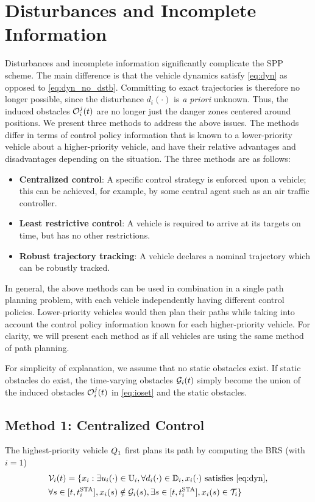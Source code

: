 \section{Disturbances and Incomplete Information \label{sec:obs_gen}}
Disturbances and incomplete information significantly complicate the SPP scheme. The main difference is that the vehicle dynamics satisfy \eqref{eq:dyn} as opposed to \eqref{eq:dyn_no_dstb}. Committing to exact trajectories is therefore no longer possible, since the disturbance $d_i(\cdot)$ is \textit{a priori} unknown. Thus, the induced obstacles $\mathcal{O}_i^j(t)$ are no longer just the danger zones centered around positions. We present three methods to address the above issues. The methods differ in terms of control policy information that is known to a lower-priority vehicle about a higher-priority vehicle, and have their relative advantages and disadvantages depending on the situation. The three methods are as follows:
\begin{itemize}
\item \textbf{Centralized control}: A specific control strategy is enforced upon a vehicle; this can be achieved, for example, by some central agent such as an air traffic controller.
\item \textbf{Least restrictive control}: A vehicle is required to arrive at its targets on time, but has no other restrictions.
\item \textbf{Robust trajectory tracking}: A vehicle declares a nominal trajectory which can be robustly tracked.
\end{itemize}

In general, the above methods can be used in combination in a single path planning problem, with each vehicle independently having different control policies. Lower-priority vehicles would then plan their paths while taking into account the control policy information known for each higher-priority vehicle. For clarity, we will present each method as if all vehicles are using the same method of path planning.

For simplicity of explanation, we assume that no static obstacles exist. If static obstacles do exist, the time-varying obstacles $\mathcal{G}_i(t)$ simply become the union of the induced obstacles $\mathcal{O}_i^j(t)$ in \eqref{eq:ioset} and the static obstacles.

\subsection{Method 1: Centralized Control \label{sec:cc}}
The highest-priority vehicle $Q_1$ first plans its path by computing the BRS (with $i=1$)
\vspace{-0.3em}
\begin{equation}
\label{eq:BRS}
\begin{aligned}
&\mathcal{V}_i(t) = \{x_i: \exists u_i(\cdot) \in \mathbb{U}_i, \forall d_i(\cdot) \in \mathbb{D}_i, x_i(\cdot) \text{ satisfies \eqref{eq:dyn}}, \\
&\forall s \in [t, t^\text{STA}_i], x_i(s) \notin \mathcal{G}_i(s), \exists s \in [t, t^\text{STA}_i], x_i(s) \in \mathcal{T}_i\}
\end{aligned}
\end{equation}

